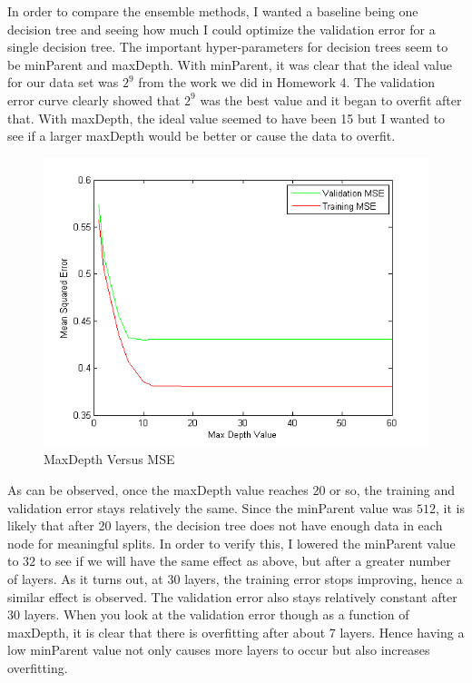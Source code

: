 \documentclass[twoside,11pt]{article}
\theoremstyle{definition}
\begin{document}
In order to compare the ensemble methods, I wanted a baseline being one decision tree and seeing how much I could optimize the validation error for a single decision tree. The important hyper-parameters for decision trees seem to be minParent and maxDepth. With minParent, it was clear that the ideal value for our data set was $2^9$ from the work we did in Homework 4. The validation error curve clearly showed that $2^9$ was the best value and it began to overfit after that. With maxDepth, the ideal value seemed to have been 15 but I wanted to see if a larger maxDepth would be better or cause the data to overfit. 
\begin{figure}[h]
\centering
\includegraphics[width=4 in]{maxDepthVersusMSE.png}
\caption{MaxDepth Versus MSE}
\end{figure}
As can be observed, once the maxDepth value reaches 20 or so, the training and validation error stays relatively the same. Since the minParent value was $512$, it is likely that after 20 layers, the decision tree does not have enough data in each node for meaningful splits. In order to verify this, I lowered the minParent value to $32$ to see if we will have the same effect as above, but after a greater number of layers. As it turns out, at 30 layers, the training error stops improving, hence a similar effect is observed. The validation error also stays relatively constant after 30 layers. When you look at the validation error though as a function of maxDepth, it is clear that there is overfitting after about 7 layers. Hence having a low minParent value not only causes more layers to occur but also increases overfitting.  \\
\end{document}
